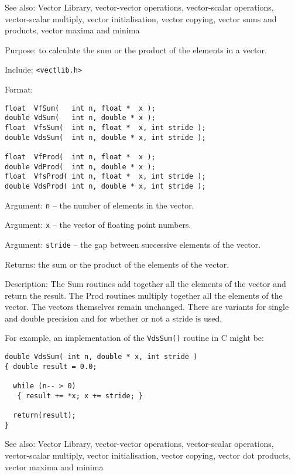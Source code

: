 See also: Vector Library, vector-vector operations, vector-scalar operations,
vector-scalar multiply, vector initialisation, vector copying, vector sums and
products, vector maxima and minima

Purpose: to calculate the sum or the product of the elements in a vector.

Include: \verb+<vectlib.h>+

Format:

\begin{verbatim}
float  VfSum(   int n, float *  x );
double VdSum(   int n, double * x );
float  VfsSum(  int n, float *  x, int stride );
double VdsSum(  int n, double * x, int stride );

float  VfProd(  int n, float *  x );
double VdProd(  int n, double * x );
float  VfsProd( int n, float *  x, int stride );
double VdsProd( int n, double * x, int stride );
\end{verbatim}

Argument: {\tt n} -- the number of elements in the vector.

Argument: {\tt x} -- the vector of floating point numbers.

Argument: {\tt stride} -- the gap between successive elements of the vector.

Returns: the sum or the product of the elements of the vector.

Description: The Sum routines add together all the elements of the vector
and return the result. The Prod routines multiply together all the
elements of the vector. The vectors themselves remain unchanged. There
are variants for single and double precision and for whether or not
a stride is used.

For example, an implementation of the {\tt VdsSum()} routine in C might be:

\begin{verbatim}
double VdsSum( int n, double * x, int stride )
{ double result = 0.0;

  while (n-- > 0)
   { result += *x; x += stride; }

  return(result);
}
\end{verbatim}

See also: Vector Library, vector-vector operations, vector-scalar
operations, vector-scalar multiply, vector initialisation, vector
copying, vector dot products, vector maxima and minima

